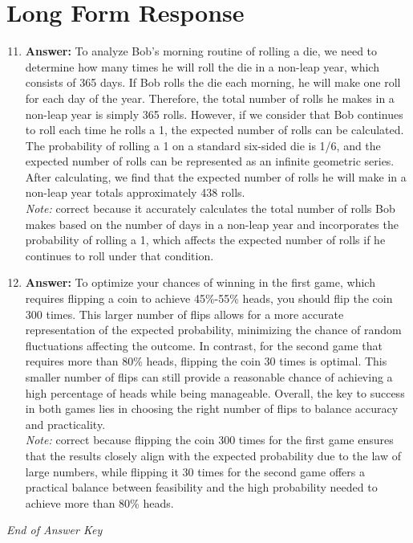 \documentclass[12pt]{article}
\begin{document}
\section*{Long Form Response}
\begin{enumerate}[label=\arabic*.]
\setcounter{enumi}{10}
\item \textbf{Answer:} To analyze Bob's morning routine of rolling a die, we need to determine how many times he will roll the die in a non-leap year, which consists of 365 days. If Bob rolls the die each morning, he will make one roll for each day of the year. Therefore, the total number of rolls he makes in a non-leap year is simply 365 rolls. However, if we consider that Bob continues to roll each time he rolls a 1, the expected number of rolls can be calculated. The probability of rolling a 1 on a standard six-sided die is 1/6, and the expected number of rolls can be represented as an infinite geometric series. After calculating, we find that the expected number of rolls he will make in a non-leap year totals approximately 438 rolls.
\\ \textit{Note:} correct because it accurately calculates the total number of rolls Bob makes based on the number of days in a non-leap year and incorporates the probability of rolling a 1, which affects the expected number of rolls if he continues to roll under that condition.
\item \textbf{Answer:} To optimize your chances of winning in the first game, which requires flipping a coin to achieve 45\%-55\% heads, you should flip the coin 300 times. This larger number of flips allows for a more accurate representation of the expected probability, minimizing the chance of random fluctuations affecting the outcome. In contrast, for the second game that requires more than 80\% heads, flipping the coin 30 times is optimal. This smaller number of flips can still provide a reasonable chance of achieving a high percentage of heads while being manageable. Overall, the key to success in both games lies in choosing the right number of flips to balance accuracy and practicality.
\\ \textit{Note:} correct because flipping the coin 300 times for the first game ensures that the results closely align with the expected probability due to the law of large numbers, while flipping it 30 times for the second game offers a practical balance between feasibility and the high probability needed to achieve more than 80\% heads.
\end{enumerate}

\vfill
\noindent\textit{End of Answer Key}
\end{document}
